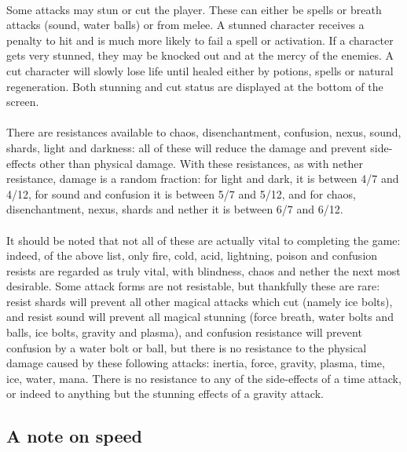 \paragraph{}
Some attacks may stun or cut the player. These can either be spells or
breath attacks (sound, water balls) or from melee. A stunned character
receives a penalty to hit and is much more likely to fail a spell or
activation. If a character gets very stunned, they may be knocked out
and at the mercy of the enemies. A cut character will slowly lose life
until healed either by potions, spells or natural regeneration. Both
stunning and cut status are displayed at the bottom of the screen.

\paragraph{}
There are resistances available to chaos, disenchantment, confusion, nexus,
sound, shards, light and darkness: all of these will reduce the damage and
prevent side-effects other than physical damage. With these resistances, as
with nether resistance, damage is a random fraction: for light and dark, it
is between 4/7 and 4/12, for sound and confusion it is between 5/7 and 5/12,
and for chaos, disenchantment, nexus, shards and nether it is between 6/7
and 6/12.

\paragraph{}
It should be noted that not all of these are actually vital to completing
the game: indeed, of the above list, only fire, cold, acid, lightning, poison
and confusion resists are regarded as truly vital, with blindness, chaos and
nether the next most desirable. Some attack forms are not resistable, but
thankfully these are rare: resist shards will prevent all other magical
attacks which cut (namely ice bolts), and resist sound will prevent all
magical stunning (force breath, water bolts and balls, ice bolts, gravity and
plasma), and confusion resistance will prevent confusion by a water bolt or
ball, but there is no resistance to the physical damage caused by these
following attacks: inertia, force, gravity, plasma, time, ice, water, mana.
There is no resistance to any of the side-effects of a time attack, or indeed
to anything but the stunning effects of a gravity attack.

\subsection{A note on speed}
